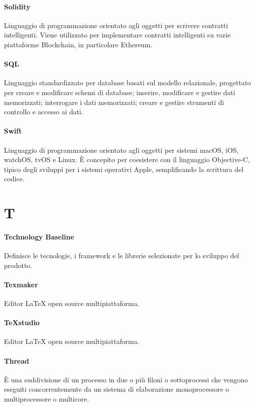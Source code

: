\documentclass[]{article}
\begin{document}
	\paragraph*{Solidity}
	Linguaggio di programmazione orientato agli oggetti per scrivere contratti intelligenti. Viene utilizzato per implementare contratti intelligenti su varie piattaforme Blockchain, in particolare Ethereum.
	
	\paragraph*{SQL}
	Linguaggio standardizzato per database basati sul modello relazionale, progettato per creare e modificare schemi di database; inserire, modificare e gestire dati memorizzati; interrogare i dati memorizzati; creare e gestire strumenti di controllo e accesso ai dati.
	
	\paragraph*{Swift}
	Linguaggio di programmazione orientato agli oggetti per sistemi macOS, iOS, watchOS, tvOS e Linux. È concepito per coesistere con il linguaggio Objective-C, tipico degli sviluppi per i sistemi operativi Apple, semplificando la scrittura del codice.
	
	\newpage
	
	\section*{T}
	
	\paragraph*{Technology Baseline}
	Definisce le tecnologie, i framework e le librerie selezionate per lo sviluppo del prodotto.
	
	\paragraph*{Texmaker}
	Editor LaTeX open source multipiattaforma.

	\paragraph*{TeXstudio}
	Editor LaTeX open source multipiattaforma.
	
	\paragraph*{Thread}
	È una suddivisione di un processo in due o più filoni o sottoprocessi che vengono eseguiti concorrentemente da un sistema di elaborazione monoprocessore o multiprocessore o multicore.
	
\end{document}
